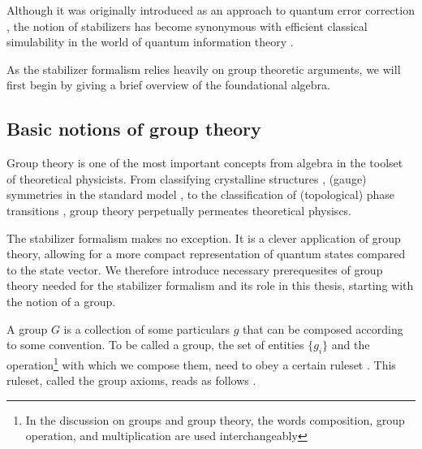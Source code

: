 Although it was originally introduced as an approach to quantum error
correction
\cite{nielsenQuantumComputationQuantum2010,gottesmanStabilizerCodesQuantum1997,gottesmanClassQuantumErrorcorrecting1996,gottesmanSurvivingQuantumComputer2024}, the notion of
stabilizers has become synonymous with efficient classical simulability in the
world of quantum information theory
\cite{nielsenQuantumComputationQuantum2010,aaronsonImprovedSimulationStabilizer2004,aaronsonIntroductionQuantumInformation,aaronsonIntroductionQuantumInformationa,fisherRandomQuantumCircuits2023}.

As the stabilizer formalism relies heavily on group theoretic arguments, we
will first begin by giving a brief overview of the foundational algebra.
\subsection{Basic notions of group theory}\label{sec:grouptheory}
Group theory is one of the most important concepts from algebra in the toolset
of theoretical physicists.  From classifying crystalline structures
\cite{ashcroftSolidStatePhysics1978}, (gauge) symmetries in the standard model
\cite{yangConservationIsotopicSpin1954}, to the classification of (topological)
phase transitions \cite{langLectureNotesTopological2021}, group theory
perpetually permeates theoretical physiscs.

The stabilizer formalism makes no exception. It is a clever application of
group theory, allowing for a more compact representation of quantum states
compared to the state vector. We therefore introduce necessary prerequesites of
group theory needed for the stabilizer formalism and its role in this thesis,
starting with the notion of a group.

A group $G$ is a collection of some particulars $g$ that can be composed
according to some convention. To be called a group, the set of entities
$\{g_i\}$ and the operation\footnote{In the discussion on groups and group
  theory, the words composition, group operation, and multiplication are used
interchangeably} with which we compose them, need to obey a certain
ruleset \cite{zeeGroupTheoryNutshell2016}. This ruleset, called the group axioms, reads as follows
\cite{stroppelHoehereMathematik12023}.


